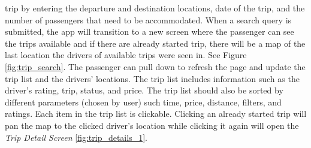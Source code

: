 \documentclass[a4paper, 12pt]{report} %
\begin{document}
 trip by entering the departure and destination locations, date of the trip, and the number of passengers that need to be accommodated. When a search query is submitted, the app will transition to a new screen where the passenger can see the trips available and if there are already started trip, there will be a map of the last location the drivers of available trips were seen in. See Figure \ref{fig:trip_search}. The passenger can pull down to refresh the page and update the trip list and the drivers' locations. The trip list includes information such as the driver's rating, trip, status, and price. The trip list should also be sorted by different parameters (chosen by user) such time, price, distance, filters, and ratings. Each item in the trip list is clickable. Clicking an already started trip will pan the map to the clicked driver's location while clicking it again will open the \textit{Trip Detail Screen} \ref{fig:trip_details_1}. 
\end{document}
